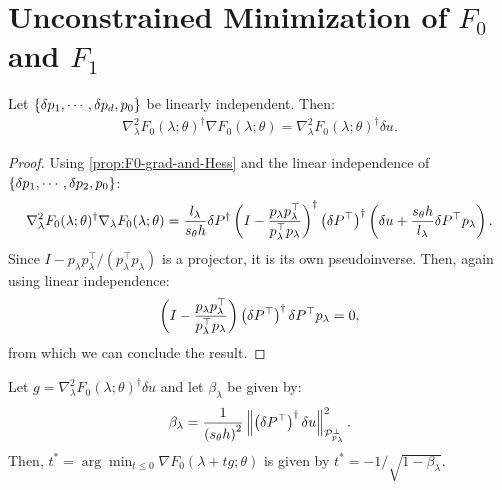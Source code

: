 \documentclass{standalone}
\begin{document}
\section{Unconstrained Minimization of $F_0$ and $F_1$}

\begin{lemma}
  Let $\left\{\delta p_1, \cdots, \delta p_d, p_0\right\}$ be linearly
  independent. Then:
  \begin{align*}
    \nabla_\lambda^2 F_0(\lambda; \theta)^\dagger \nabla F_0(\lambda; \theta) = \nabla_\lambda^2 F_0(\lambda; \theta)^\dagger \delta u.
  \end{align*}
\end{lemma}

\begin{proof}
  Using \cref{prop:F0-grad-and-Hess} and the linear independence
  of $\left\{\delta p_1, \cdots, \delta p_2, p_0\right\}$:
  \begin{align*}
    \nabla^2_\lambda F_0(\lambda; \theta)^\dagger \nabla_\lambda F_0(\lambda; \theta) = \frac{l_\lambda}{s_\theta h} \delta P^\dagger \left(I - \frac{p_\lambda p_\lambda^\top}{p_\lambda^\top p_\lambda}\right)^\dagger \left(\delta P^{\top}\right)^\dagger \left(\delta u + \frac{s_\theta h}{l_\lambda} \delta P^\top p_\lambda\right).
  \end{align*}
  Since $I - p_\lambda p_\lambda^\top/(p_\lambda^\top p_\lambda)$ is a
  projector, it is its own pseudoinverse. Then, again using linear
  independence:
  \begin{align*}
    \left(I - \frac{p_\lambda p_\lambda^\top}{p_\lambda^\top p_\lambda}\right) \left(\delta P^{\top}\right)^\dagger \delta P^\top p_\lambda = 0,
  \end{align*}
  from which we can conclude the result.
\end{proof}

\begin{lemma}
  Let $g = \nabla^2_\lambda F_0(\lambda; \theta)^\dagger \delta u$ and
  let $\beta_\lambda$ be given by:
  \begin{align*}
    \beta_\lambda = \frac{1}{\left(s_\theta h\right)^2} \left\|\left(\delta P^\top\right)^\dagger \delta u\right\|^2_{\mathcal{P}^\perp_{p_\lambda}}.
  \end{align*}
  Then, $t^* = \arg\min_{t \leq 0} \nabla F_0(\lambda + t g; \theta)$
  is given by $t^* = -1/\sqrt{1 - \beta_\lambda}$.
\end{lemma}
\end{document}
